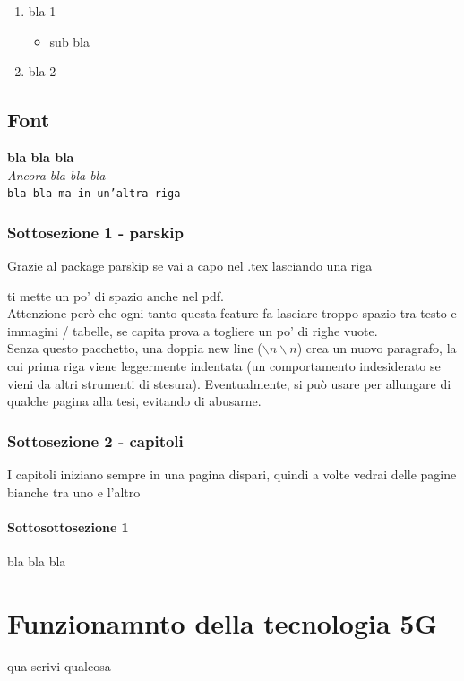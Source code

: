 \documentclass[12pt,a4paper,twoside]{book}
\begin{document}
\begin{enumerate}
    \item bla 1
    \begin{itemize}
        \item sub bla
    \end{itemize}
    \item bla 2
\end{enumerate}

\section{Font}
\textbf{bla bla bla}\\
\textit{Ancora bla bla bla}\\
\texttt{bla bla ma in un'altra riga}

\subsection{Sottosezione 1 - parskip}
Grazie al package parskip se vai a capo nel .tex lasciando una riga

ti mette un po' di spazio anche nel pdf.\\
Attenzione però che ogni tanto questa feature fa lasciare troppo spazio tra testo e immagini / tabelle, se capita prova a togliere un po' di righe vuote. \\
Senza questo pacchetto, una doppia new line (\texttt{$\backslash n\backslash n$}) crea un nuovo paragrafo, la cui prima riga viene leggermente indentata (un comportamento indesiderato se vieni da altri strumenti di stesura). Eventualmente, si può usare per allungare di qualche pagina alla tesi, evitando di abusarne.
\subsection{Sottosezione 2 - capitoli}
I capitoli iniziano sempre in una pagina dispari, quindi a volte vedrai delle pagine bianche tra uno e l'altro
\subsubsection{Sottosottosezione 1} \label{subsub:bla}
bla bla bla

\chapter{Funzionamnto della tecnologia 5G}
qua scrivi qualcosa
\end{document}
